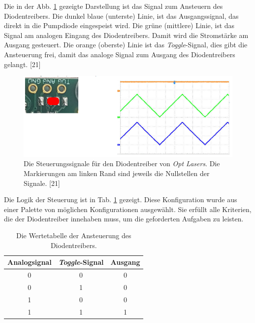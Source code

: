 Die in der Abb. \ref{fig:diodentreiber_modus_hw} gezeigte Darstellung ist das Signal zum Ansteuern des Diodentreibers. Die dunkel blaue (unterste) Linie, ist das Ausgangssignal, das direkt in die Pumpdiode eingespeist wird. Die grüne (mittlere) Linie, ist das Signal am analogen Eingang des Diodentreibers. Damit wird die Stromstärke am Ausgang gesteuert. Die orange (oberste) Linie ist das \textit{Toggle}-Signal, dies gibt die Ansteuerung frei, damit das analoge Signal zum Ausgang des Diodentreibers gelangt. [21]

\begin{figure}[H]
    \centering
    \includegraphics[scale=0.75, trim={70mm 0mm 0mm 0mm}, clip]{98_images/ldd_schema_modus.PNG}
    \caption{Die Steuerungssignale für den Diodentreiber von \textit{Opt Lasers}. Die Markierungen am linken Rand sind jeweils die Nullstellen der Signale. [21]}
    \label{fig:diodentreiber_modus_hw}
\end{figure}

Die Logik der Steuerung ist in Tab. \ref{fig:diodentreiber_modus_hw} gezeigt. Diese Konfiguration wurde aus einer Palette von möglichen Konfigurationen ausgewählt. Sie erfüllt alle Kriterien, die der Diodentreiber innehaben muss, um die geforderten Aufgaben zu leisten.

\begin{table}[H]
    \centering
    \begin{tabular}{c|c|c}
         Analogsignal&       \textit{Toggle}-Signal&     Ausgang\\
         \hline
         0&             0&          0\\
         0&             1&          0\\
         1&             0&          0\\
         1&             1&          1
    \end{tabular}
    \caption{Die Wertetabelle der Ansteuerung des Diodentreibers.}
    \label{tab:ldd_wertetabelle}
\end{table}

